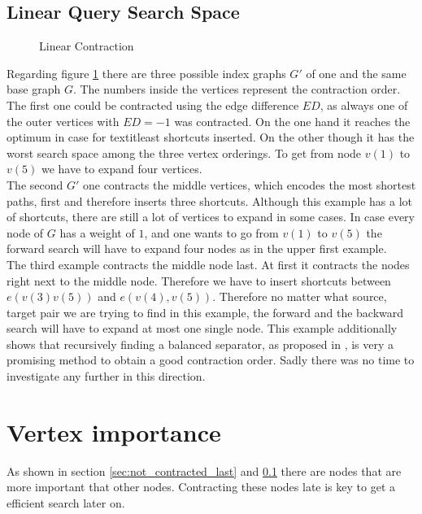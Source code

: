 \subsection{Linear Query Search Space}\label{sec:linear_query}

\begin{figure}
\centering

\caption{Linear Contraction}
\label{fig:linear_contraction}
\end{figure}

Regarding figure \ref{fig:linear_contraction} there are three possible index graphs $G'$ of one and the same base graph $G$. The numbers inside the vertices represent the contraction order.
\\
The first one could be contracted using the edge difference $ED$, as always one of the outer vertices with $ED=-1$ was contracted. On the one hand it reaches the optimum in case for textit{least shortcuts inserted}. On the other though it has the worst search space among the three vertex orderings. 
To get from node $v(1)$ to $v(5)$ we have to expand four vertices. 
\\
The second $G'$ one contracts the middle vertices, which encodes the most shortest paths, first and therefore inserts three shortcuts. Although this example has a lot of shortcuts, there are still a lot of vertices to expand in some cases. In case every node of $G$ has a weight of $1$, and one wants to go from $v(1)$ to $v(5)$ the forward search will have to expand four nodes as in the upper first example.
\\
The third example contracts the middle node last. At first it contracts the nodes right next to the middle node. Therefore we have to insert shortcuts between $e(v(3)v(5))$ and $e(v(4), v(5))$.
Therefore no matter what source, target pair we are trying to find in this example, the forward and the backward search will have to expand at most one single node. This example additionally shows that
recursively finding a balanced separator, as proposed in \cite[Customization Contraction Hierarchies]{CCH}, is very a promising method to obtain a good contraction order. Sadly there was no time to 
investigate any further in this direction.  

\section{Vertex importance}\label{sec:vertex_importance}

As shown in section \ref{sec:not_contracted_last} and \ref{sec:linear_query} there are nodes that are more important that other nodes. Contracting these nodes late is key to get a efficient search later on. 


